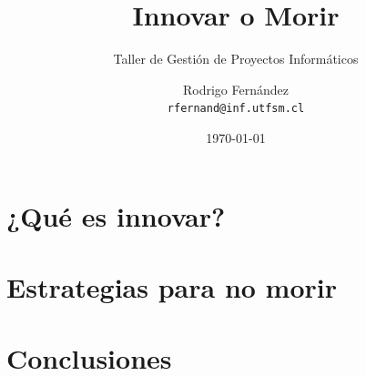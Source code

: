 \documentclass[12pt]{beamer}
\title{Innovar o Morir}
\subtitle{Taller de Gestión de Proyectos Informáticos}
\author[R. Fernández]{Rodrigo Fernández \\ \small{\texttt{rfernand@inf.utfsm.cl}}}
\institute[]{Universidad Técnica Federico Santa María}
\date{\today}
\begin{document}
    \frame{\titlepage}
    \frame{\tableofcontents}
	\section{¿Qué es innovar?}
    
	\section{Estrategias para no morir}
    
    \section{Conclusiones}
    
\end{document}
